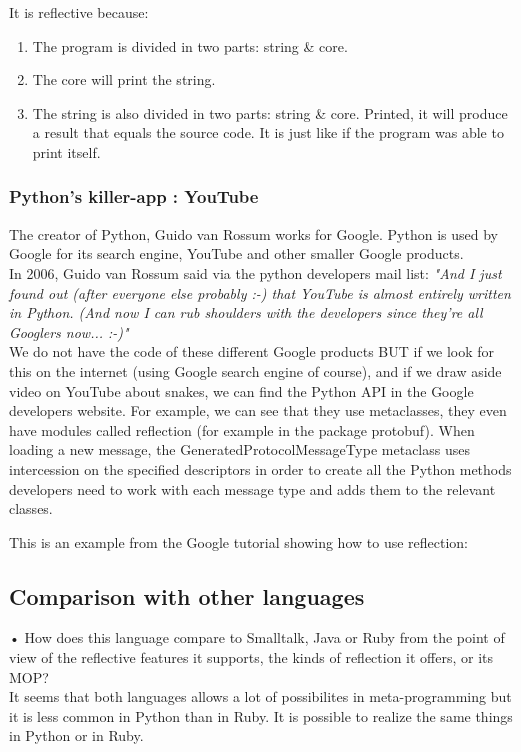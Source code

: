 It is reflective because:
\begin{enumerate}
    \item The program is divided in two parts: string \& core.
    \item The core will print the string.
    \item The string is also divided in two parts: string \& core. Printed, it will produce a result that equals the source code. It is just like if the program was able to print itself. 
\end{enumerate}

\subsubsection{Python's killer-app : YouTube}
The creator of Python, Guido van Rossum works for Google. Python is used by Google for its search engine, YouTube and other smaller Google products.\\

In 2006, Guido van Rossum said via the python developers mail list:
\emph{"And I just found out (after everyone else probably :-) that YouTube is almost entirely written in Python. (And now I can rub shoulders with the developers since they're all Googlers now... :-)"}\\

We do not have the code of these different Google products BUT if we look for this on the internet (using Google search engine of course), and if we draw aside video on YouTube about snakes, we can find the Python API in the Google developers website. For example, we can see that they use metaclasses, they even have modules called reflection (for example in the package protobuf). When loading a new message, the GeneratedProtocolMessageType metaclass uses intercession on the specified descriptors in order to create all the Python methods developers need to work with each message type and adds them to the relevant classes. \cite{google_reflection_references, google_reflection_tutorial}

This is an example from the Google tutorial showing how to use reflection:



\subsection{Comparison with other languages}
•	How does this language compare to Smalltalk, Java or Ruby from the point of view of the reflective features it supports, the kinds of reflection it offers, or its MOP?\\
It seems that both languages allows a lot of possibilites in meta-programming but it is less common in Python than in Ruby. It is possible to realize the same things in Python or in Ruby.

